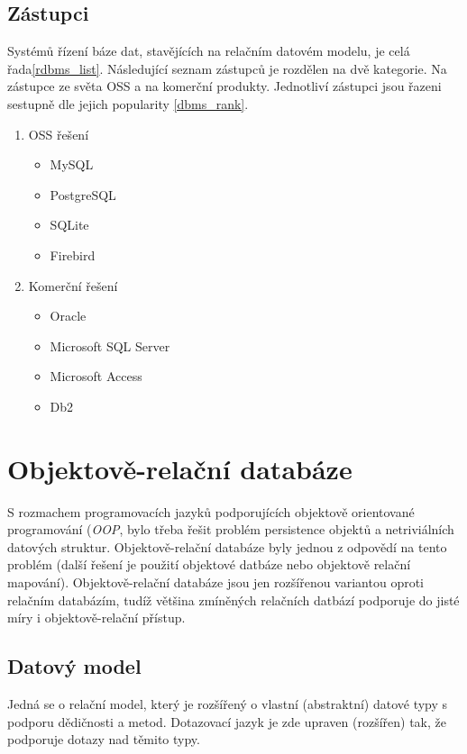 \subsection{Zástupci}
Systémů řízení báze dat, stavějících na relačním datovém modelu, je celá řada\cref{rdbms_list}. Následující seznam zástupců je rozdělen na dvě kategorie. Na zástupce ze světa OSS a na komerční produkty. Jednotliví zástupci jsou řazeni sestupně dle jejich popularity \cref{dbms_rank}.
\begin{enumerate}
  \item OSS řešení
  \begin{itemize}
    \item MySQL
    \item PostgreSQL
    \item SQLite
    \item Firebird
  \end{itemize}
  \item Komerční řešení
  \begin{itemize}
    \item Oracle
    \item Microsoft SQL Server
    \item Microsoft Access
    \item Db2
  \end{itemize}
  
\end{enumerate}
\section{Objektově-relační databáze}
S rozmachem programovacích jazyků podporujících objektově orientované programování (\emph{OOP}, bylo třeba řešit problém persistence objektů a netriviálních datových struktur. Objektově-relační databáze byly jednou z odpovědí na tento problém (další řešení je použití objektové datbáze nebo objektově relační mapování). Objektově-relační databáze jsou jen rozšířenou variantou oproti relačním databázím, tudíž většina zmíněných relačních datbází podporuje do jisté míry i objektově-relační přístup.
\subsection{Datový model}
Jedná se o relační model, který je rozšířený o vlastní (abstraktní) datové typy s podporu dědičnosti a metod. Dotazovací jazyk je zde upraven (rozšířen) tak, že podporuje dotazy nad těmito typy.\cite[s.~945--964]{korth:dbsc}

